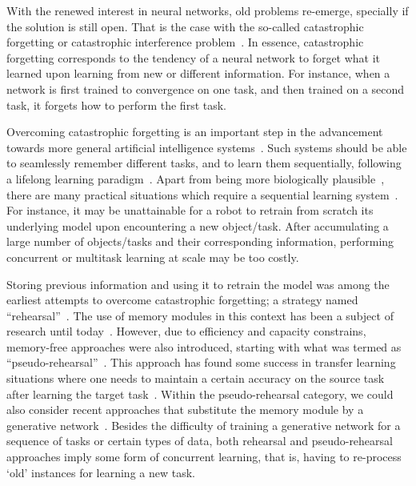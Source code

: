With the renewed interest in neural networks, old problems re-emerge, specially if the solution is still open. That is the case with the so-called catastrophic forgetting or catastrophic interference problem~\cite{McCloskey89PLM,Ratcliff90PR}. In essence, catastrophic forgetting corresponds to the tendency of a neural network to forget what it learned upon learning from new or different information. For instance, when a network is first trained to convergence on one task, and then trained on a second task, it forgets how to perform the first task. 


Overcoming catastrophic forgetting is an important step in the advancement towards more general artificial intelligence systems~\cite{Legg07MM}. Such systems should be able to seamlessly remember different tasks, and to learn them sequentially, following a lifelong learning paradigm~\cite{Thrun95RAS}. Apart from being more biologically plausible~\cite{Clegg98TCS}, there are many practical situations which require a sequential learning system~\citep[cf.][]{Thrun95RAS}. For instance, it may be unattainable for a robot to retrain from scratch its underlying model upon encountering a new object/task. After accumulating a large number of objects/tasks and their corresponding information, performing concurrent or multitask learning at scale may be too costly. 

Storing previous information and using it to retrain the model was among the earliest attempts to overcome catastrophic forgetting; a strategy named ``rehearsal''~\cite{Robins95CS}. The use of memory modules in this context has been a subject of research until today~\cite{Rebuffi2017CVPR,LopezPaz17NIPS}. However, due to efficiency and capacity constrains, memory-free approaches were also introduced, starting with what was termed as ``pseudo-rehearsal''~\cite{Robins95CS}. This approach has found some success in transfer learning situations where one needs to maintain a certain accuracy on the source task after learning the target task~\cite{Jung16ARXIV,Li17PAMI}. Within the pseudo-rehearsal category, we could also consider recent approaches that substitute the memory module by a generative network~\cite{Venkatesan17ARXIV,Shin17NIPS,Nguyen17ARXIV}. Besides the difficulty of training a generative network for a sequence of tasks or certain types of data, both rehearsal and pseudo-rehearsal approaches imply some form of concurrent learning, that is, having to re-process `old' instances for learning a new task.

